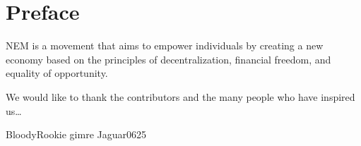\section*{Preface}


NEM is a movement that aims to empower individuals by creating a new economy based on the principles of decentralization, financial freedom, and equality of opportunity.

We would like to thank the contributors and the many people who have inspired us\ldots

\begin{flushright}
BloodyRookie
gimre
Jaguar0625
\end{flushright}
